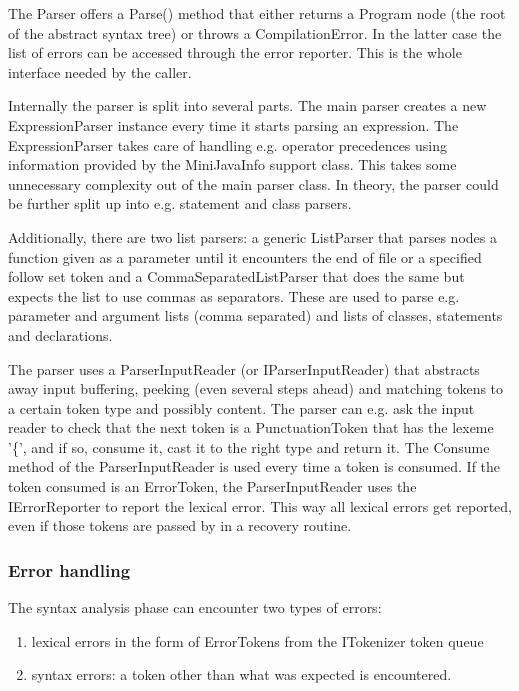 \documentclass[a4paper,11pt]{article}
\begin{document}
The Parser offers a Parse() method that either returns a Program node (the root of the abstract syntax tree) or throws a CompilationError. In the latter case the list of errors can be accessed through the error reporter. This is the whole interface needed by the caller.

Internally the parser is split into several parts. The main parser creates a new ExpressionParser instance every time it starts parsing an expression. The ExpressionParser takes care of handling e.g. operator precedences using information provided by the MiniJavaInfo support class. This takes some unnecessary complexity out of the main parser class. In theory, the parser could be further split up into e.g. statement and class parsers.

Additionally, there are two list parsers: a generic ListParser that parses nodes a function given as a parameter until it encounters the end of file or a specified follow set token and a CommaSeparatedListParser that does the same but expects the list to use commas as separators. These are used to parse e.g. parameter and argument lists (comma separated) and lists of classes, statements and declarations.

The parser uses a ParserInputReader (or IParserInputReader) that abstracts away input buffering, peeking (even several steps ahead) and matching tokens to a certain token type and possibly content. The parser can e.g. ask the input reader to check that the next token is a PunctuationToken that has the lexeme '\{', and if so, consume it, cast it to the right type and return it. The Consume method of the ParserInputReader is used every time a token is consumed. If the token consumed is an ErrorToken, the ParserInputReader uses the IErrorReporter to report the lexical error. This way all lexical errors get reported, even if those tokens are passed by in a recovery routine.

\subsubsection{Error handling}

The syntax analysis phase can encounter two types of errors:
\begin{enumerate}
\item lexical errors in the form of ErrorTokens from the ITokenizer token queue
\item syntax errors: a token other than what was expected is encountered.
\end{enumerate}
\end{document}
